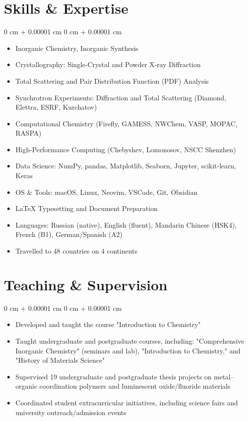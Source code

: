 \documentclass[10pt, letterpaper]{article}
\newenvironment{highlights}{
    \begin{itemize}[
        topsep=0.10 cm,
        parsep=0.10 cm,
        partopsep=0pt,
        itemsep=0pt,
        leftmargin=0 cm + 10pt
    ]
}{
    \end{itemize}
} %
\newenvironment{onecolentry}{
    \begin{adjustwidth}{
        0 cm + 0.00001 cm
    }{
        0 cm + 0.00001 cm
    }
}{
    \end{adjustwidth}
} %
\begin{document}
\section{Skills \& Expertise}        
\vspace{0.10 cm}
\begin{onecolentry}
    \begin{highlights}
        \item Inorganic Chemistry, Inorganic Synthesis
        \item Crystallography: Single-Crystal and Powder X-ray Diffraction
        \item Total Scattering and Pair Distribution Function (PDF) Analysis
        \item Synchrotron Experiments: Diffraction and Total Scattering (Diamond, Elettra, ESRF, Kurchatov)
        \item Computational Chemistry (Firefly, GAMESS, NWChem, VASP, MOPAC, RASPA)
        \item High-Performance Computing (Chebyshev, Lomonosov, NSCC Shenzhen)
        \item Data Science: NumPy, pandas, Matplotlib, Seaborn, Jupyter, scikit-learn, Keras
        \item OS \& Tools: macOS, Linux, Neovim, VSCode, Git, Obsidian
        \item LaTeX Typesetting and Document Preparation
        \item Languages: Russian (native), English (fluent), Mandarin Chinese (HSK4), French (B1), German/Spanish (A2) 
        \item Travelled to 48 countries on 4 continents
    \end{highlights}
\end{onecolentry}

\section{Teaching \& Supervision}
\vspace{0.10 cm}
\begin{onecolentry}
    \begin{highlights}
        \item Developed and taught the course "Introduction to Chemistry"
        \item Taught undergraduate and postgraduate courses, including: "Comprehensive Inorganic Chemistry" (seminars and lab), "Introduction to Chemistry," and "History of Materials Science"
        \item Supervised 19 undergraduate and postgraduate thesis projects on metal–organic coordination polymers and luminescent oxide/fluoride materials
        \item Coordinated student extracurricular initiatives, including science fairs and university outreach/admission events
    \end{highlights}
\end{onecolentry}
\end{document}
